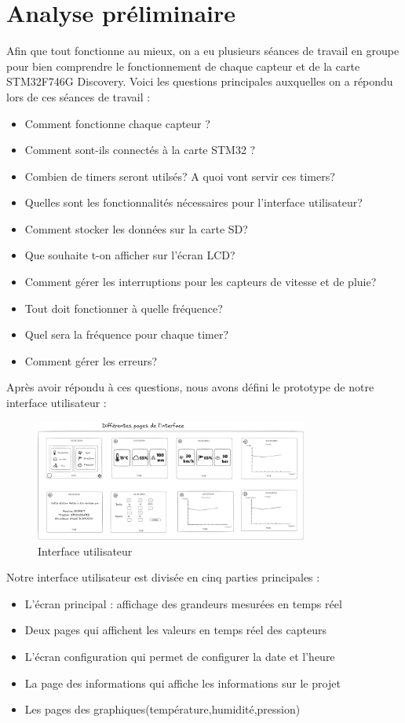 \documentclass[12pt]{article}
\begin{document}
\section{Analyse préliminaire}
Afin que tout fonctionne au mieux, on a eu plusieurs séances de travail en groupe pour bien comprendre le fonctionnement de chaque capteur et de la carte STM32F746G Discovery.
Voici les questions principales auxquelles on a répondu lors de ces séances de travail :
\begin{itemize}
    \item Comment fonctionne chaque capteur ?
    \item Comment sont-ils connectés à la carte STM32 ?
    \item Combien de timers seront utilsés? A quoi vont servir ces timers?
    \item Quelles sont les fonctionnalités nécessaires pour l'interface utilisateur?
    \item Comment stocker les données sur la carte SD?
    \item Que souhaite t-on afficher sur l'écran LCD?
    \item Comment gérer les interruptions pour les capteurs de vitesse et de pluie?
    \item Tout doit fonctionner à quelle fréquence?
    \item Quel sera la fréquence pour chaque timer?
    \item Comment gérer les erreurs?
\end{itemize}

Après avoir répondu à ces questions, nous avons défini le prototype de notre interface utilisateur :

\begin{figure}[H]
    \capstart
    \centering
    \includegraphics[width=0.8\textwidth]{./images/prototype_interface1.png}
    \caption{Interface utilisateur}
    \label{fig:interface}
\end{figure}

Notre interface utilisateur est divisée en cinq parties principales :
\begin{itemize}
    \item L'écran principal : affichage des grandeurs mesurées en temps réel
    \item Deux pages qui affichent les valeurs en temps réel des capteurs
    \item L'écran configuration qui permet de configurer la date et l'heure
    \item La page des informations qui affiche les informations sur le projet
    \item Les pages des graphiques(température,humidité,pression)
\end{itemize}
\end{document}
